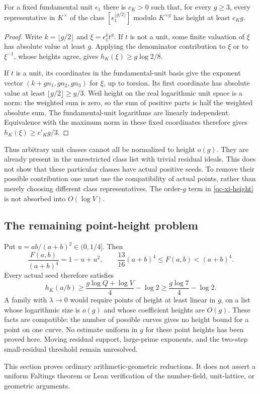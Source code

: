 \begin{lemma}
\label{qc-unit-lower-bound}
For a fixed fundamental unit $\epsilon_1$ there is $c_K>0$ such that,
for every $g\ge3$, every representative in $K^\times$ of the class
$[\epsilon_1^{\lfloor g/2\rfloor}]$ modulo $K^{\times g}$ has
height at least $c_Kg$.
\end{lemma}
\begin{proof}
Write $k=\lfloor g/2\rfloor$ and $\xi=\epsilon_1^kt^g$. If $t$
is not a unit, some finite valuation of $\xi$ has absolute value at
least $g$. Applying the denominator contribution to $\xi$ or to
$\xi^{-1}$, whose heights agree, gives
$h_K(\xi)\ge g\log2/8$.

If $t$ is a unit, its coordinates in the fundamental-unit basis give
the exponent vector $(k+gn_1,gn_2,gn_3)$ for $\xi$, up to torsion.
Its first coordinate has absolute value at least $\lfloor g/2\rfloor
\ge g/3$. Weil height on the real logarithmic unit space is a norm:
the weighted sum is zero, so the sum of positive parts is half the
weighted absolute sum. The fundamental-unit logarithms are linearly
independent. Equivalence with the maximum norm in these fixed coordinates
therefore gives $h_K(\xi)\ge c'_Kg/3$.
\end{proof}

Thus arbitrary unit classes cannot all be normalized to height $o(g)$.
They are already present in the unrestricted class list with trivial
residual ideals. This does not show that these particular classes have
actual positive seeds. To remove their possible contribution one must
use the compatibility of actual points, rather than merely choosing
different class representatives. The order-$g$ term in
\eqref{qc-xi-height} is not absorbed into $O(\log V)$.

\subsection{The remaining point-height problem}

Put $u=ab/(a+b)^2\in(0,1/4]$. Then
\[
 \frac{F(a,b)}{(a+b)^4}=1-u+u^2,\qquad
 \frac{13}{16}(a+b)^4\le F(a,b)<(a+b)^4.
\]
Every actual seed therefore satisfies
\begin{equation}\label{qc-point-height-lower}
 h_K(a/b)\ge\frac{g\log Q+\log V}{4}-\log2
          \ge\frac{g\log7}{4}-\log2.
\end{equation}
A family with $\lambda\to0$ would require points of height at least
linear in $g$, on a list whose logarithmic size is $o(g)$ and whose
coefficient heights are $O(g)$. These facts are compatible: the
number of possible curves gives no height bound for a point on one
curve. No estimate uniform in $g$ for these point heights has been
proved here. Moving residual support, large-prime exponents, and the
two-step small-residual threshold remain unresolved.

This section proves ordinary arithmetic-geometric reductions. It does
not assert a uniform Faltings theorem or Lean verification of the
number-field, unit-lattice, or geometric arguments.

